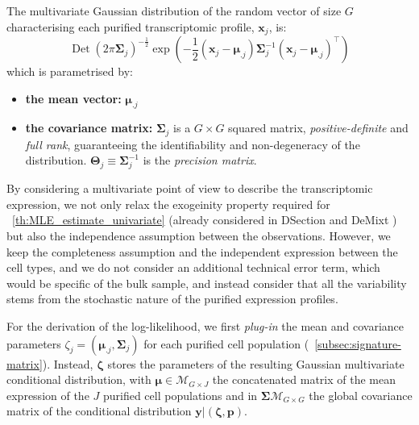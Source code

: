 \documentclass[long, final]{jobim}
\DeclareMathOperator*{\DET}{Det}
\begin{document}
\begin{definition}
\label{def:multivariate-gaussian-distribution}
The multivariate Gaussian distribution of the random vector of size $G$ characterising each purified transcriptomic profile, $\boldsymbol{x}_j$, is:
\begin{equation*}
    \DET(2\pi\boldsymbol{\Sigma}_j)^{-\frac{1}{2}} \exp\left( -\frac{1}{2} (\boldsymbol{x}_j - \boldsymbol{\mu}_{.j}) \boldsymbol{\Sigma}_j^{-1} (\boldsymbol{x}_j - \boldsymbol{\mu}_{.j})^\top\right)
\end{equation*}
which is parametrised by:
\begin{itemize}
    \item \textbf{the mean vector:} $\boldsymbol{\mu}_{.j}$ 
    \item \textbf{the covariance matrix:} $\boldsymbol{\Sigma}_j$ is a $G\times G$ squared matrix, \textit{positive-definite} and \textit{full rank}, guaranteeing the identifiability and non-degeneracy of the distribution. $\boldsymbol{\Theta}_j \equiv \boldsymbol{\Sigma}_j^{-1}$ is the \textit{precision matrix}.
\end{itemize}
\end{definition}

By considering a multivariate point of view to describe the transcriptomic expression, we not only relax the exogeinity property required for \theoremname~\ref{th:MLE_estimate_univariate} (already considered in  DSection \cite{erkkila_etal10} and DeMixt \cite{wang_etal18}) but also the independence assumption between the observations. However, we keep the completeness assumption and the independent expression between the cell types, and we do not consider an additional technical error term, which would be specific of the bulk sample, and instead consider that all the variability stems from the stochastic nature of the purified expression profiles. 




For the derivation of the log-likelihood, we first \textit{plug-in} the mean and covariance parameters $\zeta_j=\left(\boldsymbol{\mu}_{.j}, \boldsymbol{\Sigma}_j\right)$ for each purified cell population (\sectionname~\ref{subsec:signature-matrix}). Instead, $\boldsymbol{\zeta}$ stores the parameters of the resulting Gaussian multivariate conditional distribution, with $\boldsymbol{\mu} \in \mathcal{M}_{G \times J}$ the concatenated matrix of the mean expression of the $J$ purified cell populations and in $\boldsymbol{\Sigma} \mathcal{M}_{G \times G}$ the global covariance matrix of the conditional distribution $\boldsymbol{y}|(\boldsymbol{\zeta}, \boldsymbol{p})$. 
\end{document}
